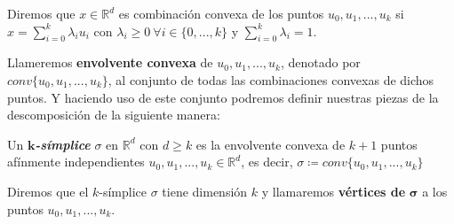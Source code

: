 \begin{definition}
Diremos que $x \in \mathbb{R}^d$ es combinación convexa de los puntos $u_0, u_1, ..., u_k$ si $x = \sum_{i=0}^{k} \lambda_i u_i$ con $\lambda_i \geq 0 \ \forall i \in \{0,...,k\}$ y $\sum_{i=0}^{k} \lambda_i = 1$.
\end{definition}

Llameremos \textbf{envolvente convexa} de $u_0, u_1, ..., u_k$, denotado por $conv\{u_0, u_1, ..., u_k\}$, al conjunto de todas las combinaciones convexas de dichos puntos. Y haciendo uso de este conjunto podremos definir nuestras piezas de la descomposición de la siguiente manera:

\begin{definition}
Un $\bm{k}$\textbf{\textit{-símplice}} $\sigma$ en $\mathbb{R}^d$ con $d \geq k$ es la envolvente convexa de $k+1$ puntos afínmente independientes  $u_0, u_1, ..., u_k \in \mathbb{R}^d$, es decir,
$\sigma \coloneqq conv\{u_0, u_1, ..., u_k\}$
\end{definition}

Diremos que el $k$-símplice $\sigma$ tiene dimensión $k$ y llamaremos \textbf{vértices de} $\bm{\sigma}$ a los puntos $u_0, u_1, ..., u_k$.

